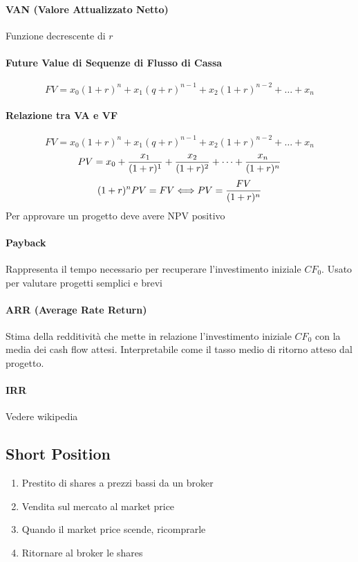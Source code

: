 \documentclass[12pt]{article}
\begin{document}
\paragraph{VAN (Valore Attualizzato Netto)} Funzione decrescente di $r$
\paragraph{Future Value di Sequenze di Flusso di Cassa}
$$FV=x_0(1+r)^n+x_1(q+r)^{n-1}+x_2(1+r)^{n-2}+\dots+x_n$$
\paragraph{Relazione tra VA e VF}
$$FV=x_0(1+r)^n+x_1(q+r)^{n-1}+x_2(1+r)^{n-2}+\dots+x_n$$
$$PV=x_0+{x_1\over(1+r)^1}+{x_2\over(1+r)^2}+\dots+{x_n\over(1+r)^n}$$
$$(1+r)^nPV=FV \Longleftrightarrow {PV = {FV\over{(1+r)^n}}}$$
Per approvare un progetto deve avere NPV positivo
\paragraph{Payback} Rappresenta il tempo necessario per recuperare l'investimento iniziale $CF_0$. Usato per valutare progetti semplici e brevi
\paragraph{ARR (Average Rate Return)} Stima della redditività che mette in relazione l'investimento iniziale $CF_0$ con la media dei cash flow attesi. Interpretabile come il tasso medio di ritorno atteso dal progetto.
\paragraph{IRR} Vedere wikipedia
\subsection{Short Position}
\begin{enumerate}
    \item Prestito di shares a prezzi bassi da un broker
    \item Vendita sul mercato al market price
    \item Quando il market price scende, ricomprarle
    \item Ritornare al broker le shares
\end{enumerate}
\end{document}
